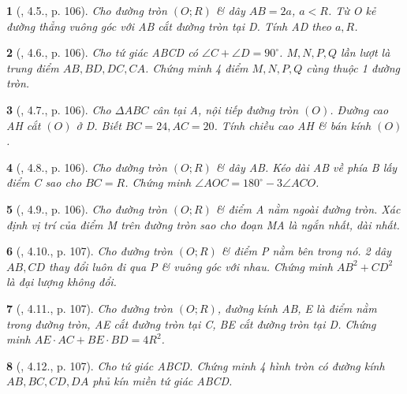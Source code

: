 \documentclass{article}
\newtheorem{baitoan}{}
\begin{document}
\begin{baitoan}[\cite{Binh_boi_duong_Toan_9_tap_1}, 4.5., p. 106]
	Cho đường tròn $(O;R)$ \& dây $AB = 2a$, $a < R$. Từ O kẻ đường thẳng vuông góc với AB cắt đường tròn tại D. Tính AD theo $a,R$.
\end{baitoan}

\begin{baitoan}[\cite{Binh_boi_duong_Toan_9_tap_1}, 4.6., p. 106]
	Cho tứ giác ABCD có $\angle{C} + \angle{D} = 90^\circ$. $M,N,P,Q$ lần lượt là trung điểm $AB,BD,DC,CA$. Chứng minh 4 điểm $M,N,P,Q$ cùng thuộc 1 đường tròn.
\end{baitoan}

\begin{baitoan}[\cite{Binh_boi_duong_Toan_9_tap_1}, 4.7., p. 106]
	Cho $\Delta ABC$ cân tại A, nội tiếp đường tròn $(O)$. Đường cao AH cắt $(O)$ ở D. Biết $BC = 24,AC = 20$. Tính chiều cao AH \& bán kính $(O)$.
\end{baitoan}

\begin{baitoan}[\cite{Binh_boi_duong_Toan_9_tap_1}, 4.8., p. 106]
	Cho đường tròn $(O;R)$ \& dây AB. Kéo dài AB về phía B lấy điểm C sao cho $BC = R$. Chứng minh $\angle{AOC} = 180^\circ - 3\angle{ACO}$.
\end{baitoan}

\begin{baitoan}[\cite{Binh_boi_duong_Toan_9_tap_1}, 4.9., p. 106]
	Cho đường tròn $(O;R)$ \& điểm A nằm ngoài đường tròn. Xác định vị trí của điểm M trên đường tròn sao cho đoạn MA là ngắn nhất, dài nhất.
\end{baitoan}

\begin{baitoan}[\cite{Binh_boi_duong_Toan_9_tap_1}, 4.10., p. 107]
	Cho đường tròn $(O;R)$ \& điểm P nằm bên trong nó. 2 dây $AB,CD$ thay đổi luôn đi qua P \& vuông góc với nhau. Chứng minh $AB^2 + CD^2$ là đại lượng không đổi.
\end{baitoan}

\begin{baitoan}[\cite{Binh_boi_duong_Toan_9_tap_1}, 4.11., p. 107]
	Cho đường tròn $(O;R)$, đường kính AB, E là điểm nằm trong đường tròn, AE cắt đường tròn tại C, BE cắt đường tròn tại D. Chứng minh $AE\cdot AC + BE\cdot BD = 4R^2$.
\end{baitoan}

\begin{baitoan}[\cite{Binh_boi_duong_Toan_9_tap_1}, 4.12., p. 107]
	Cho tứ giác ABCD. Chứng minh 4 hình tròn có đường kính $AB,BC,CD,DA$ phủ kín miền tứ giác ABCD.
\end{baitoan}
\end{document}
